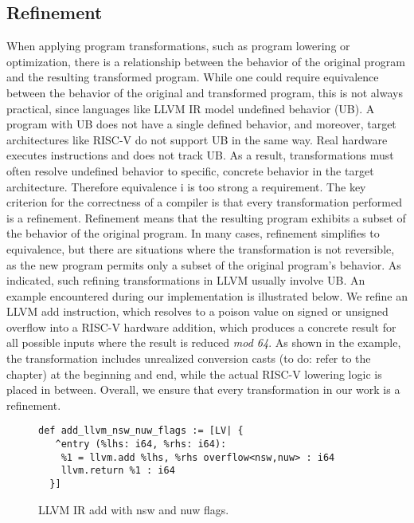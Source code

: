 \subsection{Refinement}
When applying program transformations, such as program lowering or optimization, there is a relationship between the behavior of the original program and the resulting transformed program. While one could require equivalence between the behavior of the original and transformed program, this is not always practical, since languages like LLVM IR model undefined behavior (UB). A program with UB does not have a single defined behavior, and moreover, target architectures like RISC-V do not support UB in the same way. Real hardware executes instructions and does not track UB. As a result, transformations must often resolve undefined behavior to specific, concrete behavior in the target architecture. Therefore equivalence i is too strong a requirement. The key criterion for the correctness of a compiler is that every transformation performed is a refinement. Refinement means that the resulting program exhibits a subset of the behavior of the original program. In many cases, refinement simplifies to equivalence, but there are situations where the transformation is not reversible, as the new program permits only a subset of the original program's behavior. As indicated, such refining transformations in LLVM usually involve UB. An example encountered during our implementation is illustrated below. We refine an LLVM add instruction, which resolves to a poison value on signed or unsigned overflow into a RISC-V hardware addition, which produces a concrete result for all possible inputs where the result is reduced \textit{mod 64}. As shown in the example, the transformation includes unrealized conversion casts (to do: refer to the chapter) at the beginning and end, while the actual RISC-V lowering logic is placed in between.
Overall, we ensure that every transformation in our work is a refinement.
\begin{figure}
\begin{minipage}{\textwidth}
\begin{lstlisting}
def add_llvm_nsw_nuw_flags := [LV| {
   ^entry (%lhs: i64, %rhs: i64):
    %1 = llvm.add %lhs, %rhs overflow<nsw,nuw> : i64
    llvm.return %1 : i64
  }]
\end{lstlisting}
\end{minipage}
\caption{LLVM IR add with nsw and nuw flags.}
\label{fig:LLVMIR-SEMANTICS-SHL}
\end{figure}

